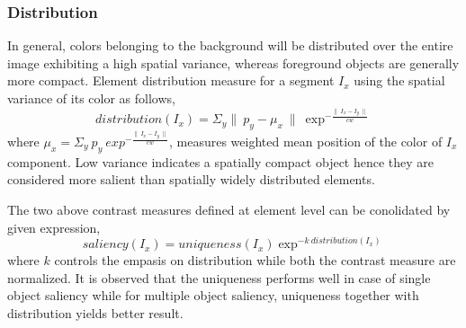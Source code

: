 \subsubsection{Distribution}
In general, colors belonging to the background will be distributed over the entire image exhibiting a high spatial variance, whereas foreground objects are generally more compact. Element distribution measure for a segment $I_{x}$ using the spatial variance of its color as follows,
$$distribution(I_{x}) = \Sigma_{y} \parallel~p_{y} -\mu_{x}~\parallel~\exp^{-\frac{\parallel~I_{x} - I_{y}~\parallel}{cw}}$$ 
where $\mu_{x} = \Sigma_{y}~p_{y}~exp^{-\frac{\parallel~I_{x} - I_{y}~\parallel}{cw}}$, measures weighted mean position of the color of $I_{x}$ component. Low variance indicates a spatially compact object hence they are considered more salient than spatially widely distributed elements.

\par The two above contrast measures defined at element level can be conolidated by given expression,
$$saliency(I_{x}) = uniqueness(I_{x}) \exp^{-k~distribution(I_{x})}$$
where $k$ controls the empasis on distribution while both the contrast measure are normalized. It is observed that the uniqueness performs well in case of single object saliency while for multiple object saliency, uniqueness together with distribution yields better result.


